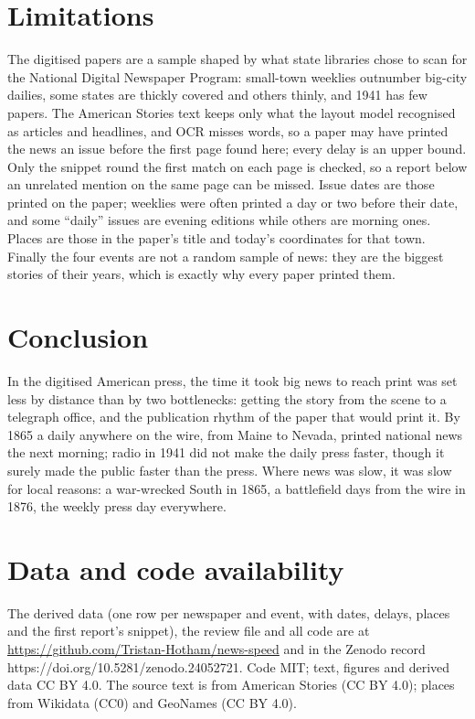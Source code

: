 \documentclass[11pt,a4paper]{article}
\begin{document}
\section{Limitations}
The digitised papers are a sample shaped by what state libraries chose to scan for the National Digital Newspaper Program: small-town weeklies outnumber big-city dailies, some states are thickly covered and others thinly, and 1941 has few papers. The American Stories text keeps only what the layout model recognised as articles and headlines, and OCR misses words, so a paper may have printed the news an issue before the first page found here; every delay is an upper bound. Only the snippet round the first match on each page is checked, so a report below an unrelated mention on the same page can be missed. Issue dates are those printed on the paper; weeklies were often printed a day or two before their date, and some ``daily'' issues are evening editions while others are morning ones. Places are those in the paper's title and today's coordinates for that town. Finally the four events are not a random sample of news: they are the biggest stories of their years, which is exactly why every paper printed them.

\section{Conclusion}
In the digitised American press, the time it took big news to reach print was set less by distance than by two bottlenecks: getting the story from the scene to a telegraph office, and the publication rhythm of the paper that would print it. By 1865 a daily anywhere on the wire, from Maine to Nevada, printed national news the next morning; radio in 1941 did not make the daily press faster, though it surely made the public faster than the press. Where news was slow, it was slow for local reasons: a war-wrecked South in 1865, a battlefield days from the wire in 1876, the weekly press day everywhere.

\section*{Data and code availability}
The derived data (one row per newspaper and event, with dates, delays, places and the first report's snippet), the review file and all code are at \url{https://github.com/Tristan-Hotham/news-speed} and in the Zenodo record https://doi.org/10.5281/zenodo.24052721. Code MIT; text, figures and derived data CC BY 4.0. The source text is from American Stories (CC BY 4.0); places from Wikidata (CC0) and GeoNames (CC BY 4.0).
\end{document}
